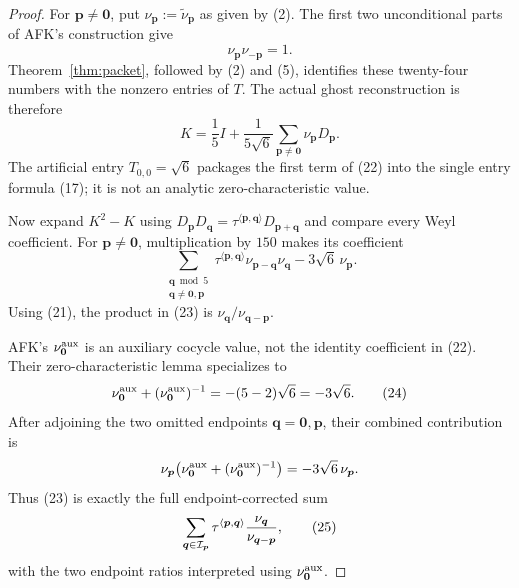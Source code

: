 \documentclass[11pt]{article}
\begin{document}
\begin{proof}
For $\boldsymbol p\ne\boldsymbol0$, put
$\nu_{\boldsymbol p}:=\widetilde\nu_{\boldsymbol p}$ as given by
(2).  The first two unconditional parts of AFK's construction give
\[
 \nu_{\boldsymbol p}\nu_{-\boldsymbol p}=1.
\tag{21}
\]
Theorem~\ref{thm:packet}, followed by (2) and (5), identifies these
twenty-four numbers with the nonzero entries of $T$.  The actual ghost
reconstruction is therefore
\[
 K=\frac15I+\frac1{5\sqrt6}
 \sum_{\boldsymbol p\ne\boldsymbol0}
 \nu_{\boldsymbol p}D_{\boldsymbol p}.
\tag{22}
\]
The artificial entry $T_{0,0}=\sqrt6$ packages the first term of
(22) into the single entry formula (17); it is not an analytic
zero-characteristic value.

Now expand $K^2-K$ using
$D_{\boldsymbol p}D_{\boldsymbol q}
=\tau^{\langle\boldsymbol p,\boldsymbol q\rangle}
D_{\boldsymbol p+\boldsymbol q}$ and compare every Weyl coefficient.
For $\boldsymbol p\ne\boldsymbol0$, multiplication by $150$ makes its
coefficient
\[
 \sum_{\substack{\boldsymbol q\bmod5\\
 \boldsymbol q\ne\boldsymbol0,\boldsymbol p}}
 \tau^{\langle\boldsymbol p,\boldsymbol q\rangle}
 \nu_{\boldsymbol p-\boldsymbol q}\nu_{\boldsymbol q}
-3\sqrt6\,\nu_{\boldsymbol p}.
\tag{23}
\]
Using (21), the product in (23) is
$\nu_{\boldsymbol q}/\nu_{\boldsymbol q-\boldsymbol p}$.

AFK's $\nu_{\boldsymbol0}^{\rm aux}$ is an auxiliary cocycle value,
not the identity coefficient in (22).  Their zero-characteristic
lemma specializes to
\[
 \nu_{\boldsymbol0}^{\rm aux}
+(\nu_{\boldsymbol0}^{\rm aux})^{-1}
=-(5-2)\sqrt6=-3\sqrt6.
\tag{24}
\]
After adjoining the two omitted endpoints
$\boldsymbol q=\boldsymbol0,\boldsymbol p$, their combined contribution
is
\[
 \nu_{\boldsymbol p}\!
 \left(\nu_{\boldsymbol0}^{\rm aux}
+(\nu_{\boldsymbol0}^{\rm aux})^{-1}\right)
=-3\sqrt6\,\nu_{\boldsymbol p}.
\]
Thus (23) is exactly the full endpoint-corrected sum
\[
 \sum_{\boldsymbol q\in{\cal I}_{\boldsymbol p}}
 \tau^{\langle\boldsymbol p,\boldsymbol q\rangle}
 \frac{\nu_{\boldsymbol q}}
 {\nu_{\boldsymbol q-\boldsymbol p}},
\tag{25}
\]
with the two endpoint ratios interpreted using
$\nu_{\boldsymbol0}^{\rm aux}$.


\end{proof}
\end{document}
